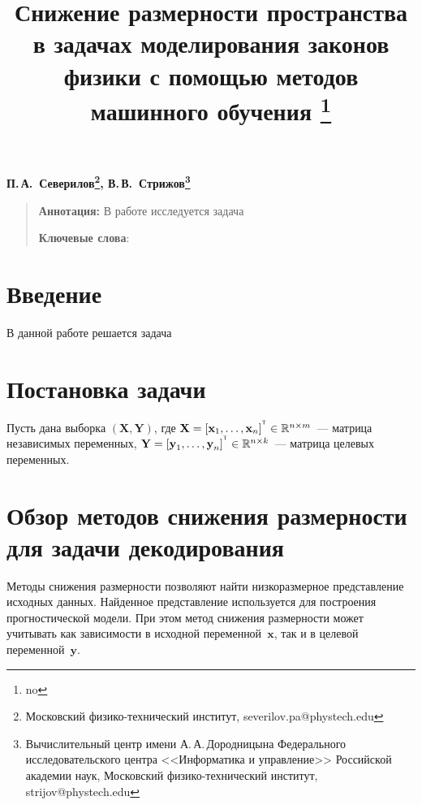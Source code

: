 \documentclass[12pt]{article}
\newcommand{\bx}{\mathbf{x}}
\newcommand{\by}{\mathbf{y}}
\newcommand{\bY}{\mathbf{Y}}
\newcommand{\bX}{\mathbf{X}}
\newcommand{\T}{^{\text{\tiny\sffamily\upshape\mdseries T}}}
\begin{document}
	\title{Снижение размерности пространства в задачах моделирования законов физики с помощью методов машинного обучения \thanks{no}}
	\date{}
	\author{}
	\maketitle
	
	\begin{center}
		\bf
		П.\,А.~Северилов\footnote{Московский физико-технический институт, severilov.pa@phystech.edu}, 
		В.\,В.~Стрижов\footnote{Вычислительный центр имени А.\,А.\,Дородницына Федерального исследовательского центра <<Информатика и управление>> Российской академии наук, Московский физико-технический институт, strijov@phystech.edu}
	\end{center}
	{\begin{quote}
			\textbf{Аннотация:}
			В работе исследуется задача 
			
			\smallskip
			\textbf{Ключевые слова}: 
			\smallskip
			
		\end{quote}
	}

	
	\section{Введение}
	В данной работе решается задача 
	
	\section{Постановка задачи}
	
	Пусть дана выборка $(\bX, \bY)$, где $\textbf{X} = [\textbf{x}_1, \dots, \textbf{x}_{n}]^{\T} \in \mathbb{R}^{n \times m}$~--- матрица независимых переменных, $\textbf{Y} = [\textbf{y}_1, \dots, \textbf{y}_n]^{\T} \in \mathbb{R}^{n \times k}$~--- матрица целевых переменных.
	
	\section{Обзор методов снижения размерности для задачи декодирования}
	\label{sec:ch1:dim_reduction}
	Методы снижения размерности позволяют найти низкоразмерное представление исходных данных. 
	Найденное представление используется для построения прогностической модели.
	При этом метод снижения размерности может учитывать как зависимости в исходной переменной~$\bx$, так и в целевой переменной~$\by$.
	
\end{document}
